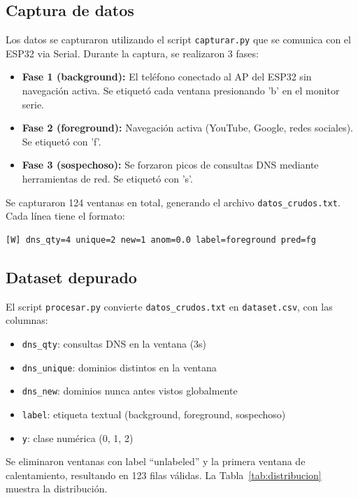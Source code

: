 \documentclass[12pt,a4paper]{article}
\begin{document}
\subsection{Captura de datos}
\label{sec:captura}

Los datos se capturaron utilizando el script \texttt{capturar.py} que se comunica con el ESP32 via Serial. Durante la captura, se realizaron 3 fases:

\begin{itemize}
    \item \textbf{Fase 1 (background):} El teléfono conectado al AP del ESP32 sin navegación activa. Se etiquetó cada ventana presionando 'b' en el monitor serie.
    \item \textbf{Fase 2 (foreground):} Navegación activa (YouTube, Google, redes sociales). Se etiquetó con 'f'.
    \item \textbf{Fase 3 (sospechoso):} Se forzaron picos de consultas DNS mediante herramientas de red. Se etiquetó con 's'.
\end{itemize}

Se capturaron 124 ventanas en total, generando el archivo \texttt{datos\_crudos.txt}. Cada línea tiene el formato:

\begin{lstlisting}[frame=none,breaklines=false]
[W] dns_qty=4 unique=2 new=1 anom=0.0 label=foreground pred=fg
\end{lstlisting}

\subsection{Dataset depurado}
\label{sec:dataset}

El script \texttt{procesar.py} convierte \texttt{datos\_crudos.txt} en \texttt{dataset.csv}, con las columnas:

\begin{itemize}
    \item \texttt{dns\_qty}: consultas DNS en la ventana (3s)
    \item \texttt{dns\_unique}: dominios distintos en la ventana
    \item \texttt{dns\_new}: dominios nunca antes vistos globalmente
    \item \texttt{label}: etiqueta textual (background, foreground, sospechoso)
    \item \texttt{y}: clase numérica (0, 1, 2)
\end{itemize}

Se eliminaron ventanas con label ``unlabeled'' y la primera ventana de calentamiento, resultando en 123 filas válidas. La Tabla~\ref{tab:distribucion} muestra la distribución.
\end{document}

